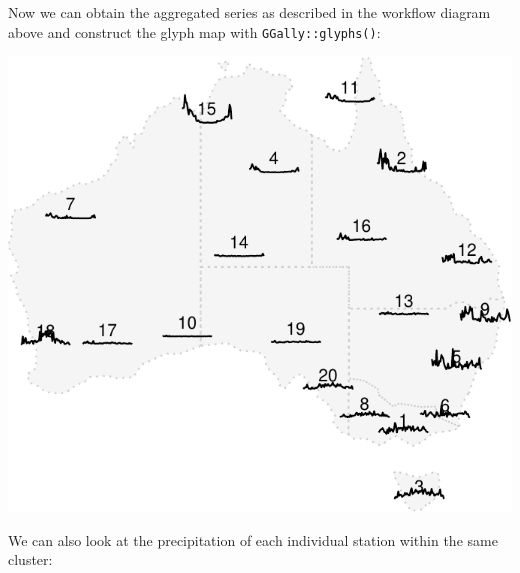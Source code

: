 \documentclass[
]{jss}
\begin{document}
Now we can obtain the aggregated series as described in the workflow
diagram above and construct the glyph map with
\texttt{GGally::glyphs()}:

\begin{CodeChunk}


\begin{center}\includegraphics{figures/unnamed-chunk-15-1} \end{center}

\end{CodeChunk}

We can also look at the precipitation of each individual station within
the same cluster:
\end{document}
